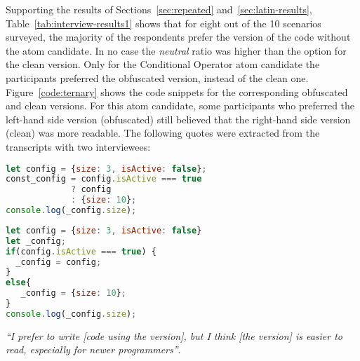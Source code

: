 Supporting the results of Sections~\ref{sec:repeated} and~\ref{sec:latin-results}, Table~\ref{tab:interview-results1}
 shows that for eight out of the
10 scenarios surveyed, the majority of the respondents prefer the version of the
code without the atom candidate.
In no case the \emph{neutral}
ratio was higher than the option for the clean version.
Only for the Conditional Operator atom candidate the participants preferred the obfuscated version, instead of the clean one. Figure~\ref{code:ternary} shows the code snippets for the corresponding obfuscated and clean versions. For this atom candidate, some participants who preferred the left-hand side version (obfuscated) still believed that the right-hand side version (clean) was more readable. The following quotes were extracted from the transcripts with
two interviewees:

\begin{figure*}

\begin{lstlisting}[language=JavaScript, caption=\emph{Left-hand side} (using the \emph{Conditional Operator} atom).]
let config = {size: 3, isActive: false};
const_config = config.isActive === true 
             ? config 
             : {size: 10};
console.log(_config.size);
\end{lstlisting}
\begin{lstlisting}[language=JavaScript, caption=\emph{Right-hand side} (without the atom).]
let config = {size: 3, isActive: false}
let _config;
if(config.isActive === true) {
  _config = config;
}
else{
   _config = {size: 10};
}
console.log(_config.size);
\end{lstlisting}
\caption{Example of a pair of code snippets used in the interview pertaining to the \emph{Conditional Operator} atom candidate}
\label{code:ternary}
\vspace{-0.2cm}
\end{figure*}

\begin{mq}
\emph{``I prefer to write [code using the \lhs version], but I think [the \rhs version] is easier to read, especially for newer programmers''}.
\end{mq}

